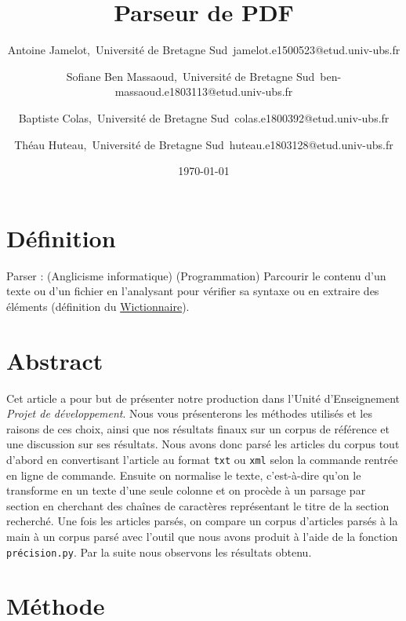 \documentclass{article}
\title{Parseur de PDF }
\author{
    Antoine Jamelot,\
    Université de Bretagne Sud\
    jamelot.e1500523@etud.univ-ubs.fr
  \and
    Sofiane Ben Massaoud,\
    Université de Bretagne Sud\
    ben-massaoud.e1803113@etud.univ-ubs.fr
   \and
    Baptiste Colas,\
    Université de Bretagne Sud\
    colas.e1800392@etud.univ-ubs.fr
    \and
    Théau Huteau,\
    Université de Bretagne Sud\
    huteau.e1803128@etud.univ-ubs.fr
}
\date{\today}
\begin{document}
\maketitle

\section{Définition}
Parser : (Anglicisme informatique) (Programmation) Parcourir le contenu d'un texte ou d'un fichier en l'analysant pour vérifier sa syntaxe ou en extraire des éléments (définition du \href{https://fr.wiktionary.org/wiki/parser}{Wictionnaire}).

\section{Abstract}
Cet article a pour but de présenter notre production dans l'Unité d'Enseignement \emph{Projet de développement}. Nous vous présenterons les méthodes utilisés et les raisons de ces choix, ainsi que nos résultats finaux sur un corpus de référence et une discussion sur ses résultats. Nous avons donc parsé les articles du corpus tout d'abord en convertisant l'article au format \texttt{txt} ou \texttt{xml} selon la commande rentrée en ligne de commande. Ensuite on normalise le texte, c'est-à-dire qu'on le transforme en un texte d'une seule colonne et on procède à un parsage par section en cherchant des chaînes de caractères représentant le titre de la section recherché. Une fois les articles parsés, on compare un corpus d'articles parsés à la main à un corpus parsé avec l'outil que nous avons produit à l'aide de la fonction \texttt{précision.py}. Par la suite nous observons les résultats obtenu.

\section{Méthode}
\end{document}
